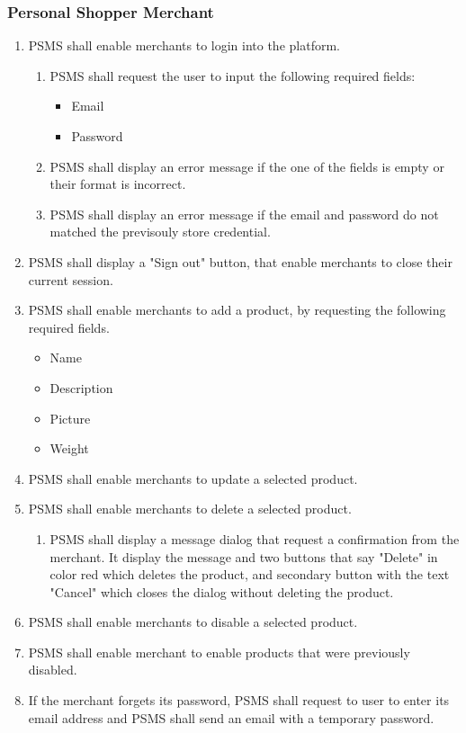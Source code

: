 \pagebreak

\subsubsection{Personal Shopper Merchant}
\begin{enumerate}[resume, label=SY-\arabic*]
    \item PSMS shall enable merchants to login into the platform.
    \begin{enumerate}[label=SY-20.\arabic*]
        \item PSMS shall request the user to input the following required 
        fields:
        \begin{itemize}
            \item Email
            \item Password
        \end{itemize}
        \item PSMS shall display an error message if the one of the fields is 
        empty or their format is incorrect.
        \item PSMS shall display an error message if the email and password 
        do not matched the previsouly store credential.
    \end{enumerate}
    \item PSMS shall display a "Sign out" button, that enable merchants to 
    close their current session.
    \item PSMS shall enable merchants to add a product, by requesting the 
    following required fields.
    \begin{itemize}
        \item Name
        \item Description
        \item Picture
        \item Weight
    \end{itemize}
    \item PSMS shall enable merchants to update a selected product.
    \item PSMS shall enable merchants to delete a selected product.
    \begin{enumerate}[label=SY-24.\arabic*]
        \item PSMS shall display a message dialog that request a confirmation 
        from the merchant. It display the message and two buttons that say
        "Delete" in color red which deletes the product, and secondary button 
        with the text "Cancel" which closes the dialog without deleting the 
        product.
    \end{enumerate}
    \item PSMS shall enable merchants to disable a selected product.
    \item PSMS shall enable merchant to enable products that were 
    previously disabled.
    \item If the merchant forgets its password, PSMS shall request to user 
    to enter its email address and PSMS shall send an email with a 
    temporary password.
\end{enumerate}

